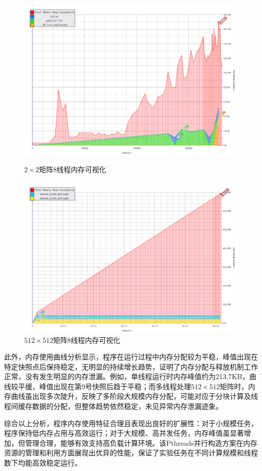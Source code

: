 \documentclass[a4paper, utf8]{ctexart}
\begin{document}
\begin{figure}[htbp]
		\begin{minipage}{.45\textwidth}
			\centering
			\includegraphics[width=.8\textwidth]{./figure/valgrind_visualize_2_8.png}
			\caption{$2\times2$矩阵8线程内存可视化}
		\end{minipage}
		\begin{minipage}{.45\textwidth}
			\centering
			\includegraphics[width=.8\textwidth]{./figure/valgrind_visualize_512_8.png}
			\caption{$512\times512$矩阵8线程内存可视化}
		\end{minipage}
	\end{figure}
	
	此外，内存使用曲线分析显示，程序在运行过程中内存分配较为平稳，峰值出现在特定快照点后保持稳定，无明显的持续增长趋势，证明了内存分配与释放机制工作正常，没有发生明显的内存泄漏。例如，单线程运行时内存峰值约为213.7KB，曲线较平缓，峰值出现在第9号快照后趋于平稳；而多线程处理$512\times512$矩阵时，内存曲线虽出现多次陡升，反映了多阶段大规模内存分配，可能对应于分块计算及线程间缓存数据的分配，但整体趋势依然稳定，未见异常内存泄漏迹象。
	
	综合以上分析，程序内存使用特征合理且表现出良好的扩展性：对于小规模任务，程序保持低内存占用与高效运行；对于大规模、高并发任务，内存峰值虽显著增加，但管理合理，能够有效支持高负载计算环境。该Pthreads并行构造方案在内存资源的管理和利用方面展现出优异的性能，保证了实验任务在不同计算规模和线程数下均能高效稳定运行。
	
\end{document}
